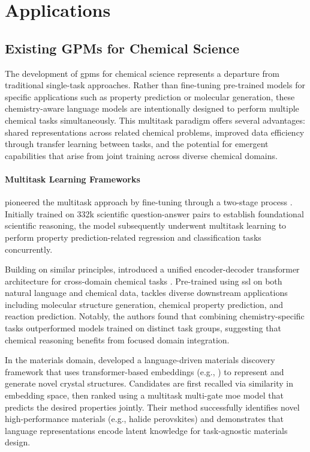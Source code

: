 \section{Applications}



\subsection{Existing GPMs for Chemical Science}

The development of \glspl{gpm} for chemical science represents a departure from traditional single-task approaches. Rather than fine-tuning pre-trained models for specific applications such as property prediction or molecular generation, these chemistry-aware language models are intentionally designed to perform multiple chemical tasks simultaneously. This multitask paradigm offers several advantages: shared representations across related chemical problems\autocite{dimitrios2023unifying}, improved data efficiency through transfer learning between tasks\autocite{lim2021predicting}, and the potential for emergent capabilities that arise from joint training across diverse chemical domains\autocite{livne2024nach0}.

\paragraph{Multitask Learning Frameworks}  pioneered the multitask approach by fine-tuning  through a two-stage process \autocite{xie2025darwin}. Initially trained on 332k scientific question-answer pairs to establish foundational scientific reasoning, the model subsequently underwent multitask learning to perform property prediction-related regression and classification tasks concurrently.

Building on similar principles,  introduced a unified encoder-decoder transformer architecture for cross-domain chemical tasks \autocite{livne2024nach0}. Pre-trained using \gls{ssl} on both natural language and chemical data,  tackles diverse downstream applications including molecular structure generation, chemical property prediction, and reaction prediction. Notably, the authors found that combining chemistry-specific tasks outperformed models trained on distinct task groups, suggesting that chemical reasoning benefits from focused domain integration.

In the materials domain, \textcite{qu2023leveraging} developed a language-driven materials discovery framework that uses transformer-based embeddings (e.g., \autocite{wan2024tokens}) to represent and generate novel crystal structures. Candidates are first recalled via similarity in embedding space, then ranked using a multitask multi-gate \gls{moe} model that predicts the desired properties jointly. 
Their method successfully identifies novel high-performance materials (e.g., halide perovskites) and demonstrates that language representations encode latent knowledge for task-agnostic materials design.

